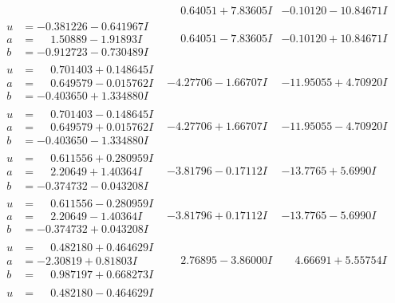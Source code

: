 \documentclass[1p]{elsarticle_modified}
\theoremstyle{definition}
\begin{document}
$$\begin{array}{c|c|c}
 & \phantom{-}0.64051 + 7.83605 I & -0.10120 - 10.84671 I \\ \hline\begin{aligned}
u &= -0.381226 - 0.641967 I \\
a &= \phantom{-}1.50889 - 1.91893 I \\
b &= -0.912723 - 0.730489 I\end{aligned}
 & \phantom{-}0.64051 - 7.83605 I & -0.10120 + 10.84671 I \\ \hline\begin{aligned}
u &= \phantom{-}0.701403 + 0.148645 I \\
a &= \phantom{-}0.649579 - 0.015762 I \\
b &= -0.403650 + 1.334880 I\end{aligned}
 & -4.27706 - 1.66707 I & -11.95055 + 4.70920 I \\ \hline\begin{aligned}
u &= \phantom{-}0.701403 - 0.148645 I \\
a &= \phantom{-}0.649579 + 0.015762 I \\
b &= -0.403650 - 1.334880 I\end{aligned}
 & -4.27706 + 1.66707 I & -11.95055 - 4.70920 I \\ \hline\begin{aligned}
u &= \phantom{-}0.611556 + 0.280959 I \\
a &= \phantom{-}2.20649 + 1.40364 I \\
b &= -0.374732 - 0.043208 I\end{aligned}
 & -3.81796 - 0.17112 I & -13.7765 + 5.6990 I \\ \hline\begin{aligned}
u &= \phantom{-}0.611556 - 0.280959 I \\
a &= \phantom{-}2.20649 - 1.40364 I \\
b &= -0.374732 + 0.043208 I\end{aligned}
 & -3.81796 + 0.17112 I & -13.7765 - 5.6990 I \\ \hline\begin{aligned}
u &= \phantom{-}0.482180 + 0.464629 I \\
a &= -2.30819 + 0.81803 I \\
b &= \phantom{-}0.987197 + 0.668273 I\end{aligned}
 & \phantom{-}2.76895 - 3.86000 I & \phantom{-}4.66691 + 5.55754 I \\ \hline\begin{aligned}
u &= \phantom{-}0.482180 - 0.464629 I \\

\end{aligned}
\end{array}$$
\end{document}
